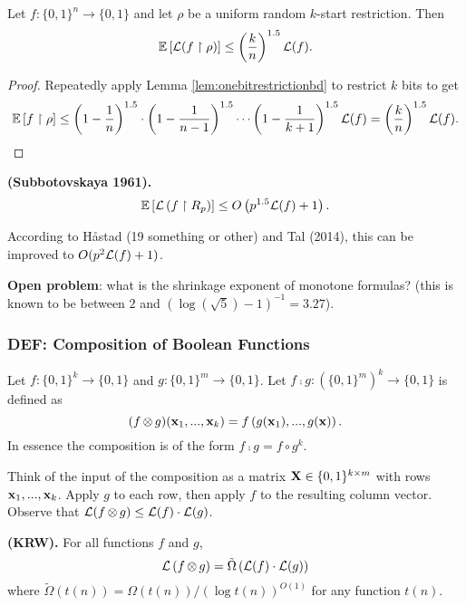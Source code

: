 \documentclass[11pt]{article}
\begin{document}
	\begin{theorem}
		\label{thm:subbotovskaya-restrictionlb}
		Let $f: \{0,1\}^n \rightarrow \{0,1\}$ and let $\rho$ be a uniform random $k$-start restriction. Then 
		\[\operatorname*{\mathbb{E}}\left[\mathcal{L}(f\upharpoonright \rho)\right] \leq \left(\frac{k}{n}\right)^{1.5}\mathcal{L}(f).\]
	\end{theorem}
	\begin{proof}
		Repeatedly apply Lemma \ref{lem:onebitrestrictionbd} to restrict $k$ bits to get
		\[\operatorname*{\mathbb{E}}\left[f \upharpoonright \rho\right] \leq \left(1 - \frac{1}{n}\right)^{1.5}\cdot\left(1 - \frac{1}{n-1}\right)^{1.5}\cdots\left(1 - \frac{1}{k+1}\right)^{1.5} \mathcal{L}(f) = \left(\frac{k}{n}\right)^{1.5}\mathcal{L}(f).\]
	\end{proof}
	
	\begin{corollary}
		\label{cor:extsubbotovskayatorandrestrictions}
		\textbf{(Subbotovskaya 1961).} 
		\[\operatorname*{\mathbb{E}}\left[\mathcal{L}\left(f\upharpoonright R_p\right)\right] \leq O\left(p^{1.5}\mathcal{L}(f) + 1\right).\]
	\end{corollary}
	According to H\aa stad (19 something or other) and Tal (2014), this can be improved to $O(p^2\mathcal{L}(f) + 1)$.
	
	\textbf{Open problem}: what is the shrinkage exponent of monotone formulas? (this is known to be between $2$ and $\left(\log (\sqrt{5}) - 1\right)^{-1} = 3.27$).

	\subsubsection{DEF: Composition of Boolean Functions}
	\begin{definition}
		Let $f:\{0,1\}^k \rightarrow \{0,1\}$ and $g: \{0,1\}^m \rightarrow \{0,1\}$. Let $f \comp g: (\{0,1\}^m)^k \rightarrow \{0,1\}$ is defined as
		\[(f \operatorname*{\otimes} g)(\mathbf{x}_1, ..., \mathbf{x}_k) = f\left(g(\mathbf{x}_1), ..., g(\mathbf{x})\right).\]
		In essence the composition is of the form $f \comp g = f \circ g^k$. 
	\end{definition}
	Think of the input of the composition as a matrix $\mathbf{X} \in \{0,1\}^{k \times m}$ with rows $\mathbf{x}_1, ..., \mathbf{x}_k$. Apply $g$ to each row, then apply $f$ to the resulting column vector. Observe that $\mathcal{L}(f \operatorname*{\otimes} g) \leq \mathcal{L}(f) \cdot \mathcal{L}(g)$. 
	
	\begin{conjecture}
		\textbf{(KRW).} For all functions $f$ and $g$,
		\[\mathcal{L}\left(f \operatorname*{\otimes} g\right) = \tilde{\Omega}\left(\mathcal{L}(f)\cdot \mathcal{L}(g)\right)\]
		where $\tilde{\Omega}(t(n)) = \Omega(t(n))/\left(\log t(n)\right)^{O(1)}$ for any function $t(n)$.
	\end{conjecture}
	
\end{document}
